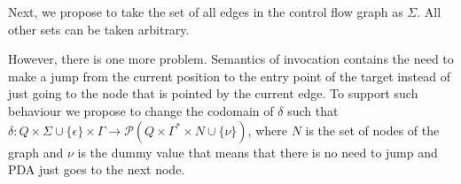 Next, we propose to take the set of all edges in the control flow graph as $\Sigma$.
All other sets can be taken arbitrary.

However, there is one more problem.
Semantics of invocation contains the need to make a jump from the current position to the entry point of the target instead of just going to the node that is pointed by the current edge.
To support such behaviour we propose to change the codomain of $\delta$ such that $\delta: Q \times \Sigma \cup \{\epsilon\} \times \Gamma \rightarrow \mathcal P (Q \times \Gamma^* \times N \cup \{\nu\})$, where $N$ is the set of nodes of the graph and $\nu$ is the dummy value that means that there is no need to jump and PDA just goes to the next node.

